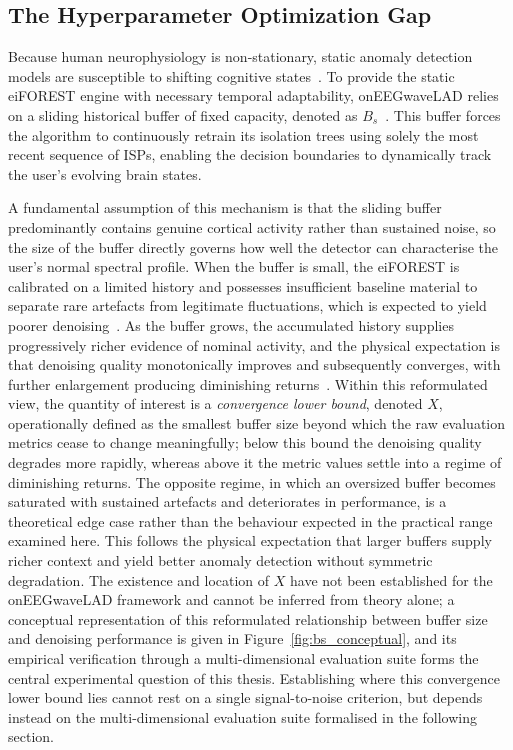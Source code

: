 \documentclass[MScCS,12pt,oneside,final]{uccthesis}
\begin{document}
        \subsection{The Hyperparameter Optimization Gap}
        \label{subsec:hyperparameter_gap}
        
        Because human neurophysiology is non-stationary, static anomaly detection models are susceptible to shifting cognitive states~\parencite{kaplan1999nonstationary}. To provide the static eiFOREST engine with necessary temporal adaptability, onEEGwaveLAD relies on a sliding historical buffer of fixed capacity, denoted as $B_s$~\parencite{longo2025oneegwavelad}. This buffer forces the algorithm to continuously retrain its isolation trees using solely the most recent sequence of ISPs, enabling the decision boundaries to dynamically track the user's evolving brain states.
        
        A fundamental assumption of this mechanism is that the sliding buffer predominantly contains genuine cortical activity rather than sustained noise, so the size of the buffer directly governs how well the detector can characterise the user's normal 
spectral profile. When the buffer is small, the eiFOREST is calibrated on a limited history and possesses insufficient baseline material to separate rare artefacts from legitimate fluctuations, which is expected to yield poorer denoising~\parencite{longo2025oneegwavelad}. As the buffer grows, the accumulated history supplies progressively richer evidence of nominal activity, and the physical expectation is that denoising quality monotonically improves and subsequently converges, with further enlargement producing diminishing returns~\parencite{gama2014survey}. Within this reformulated view, the quantity of interest is a \emph{convergence lower bound}, denoted $X$, operationally defined as the smallest buffer size beyond which the raw evaluation metrics cease to change meaningfully; below this bound the denoising quality degrades more rapidly, whereas above it the metric values settle into a regime of diminishing returns. The opposite regime, in which an oversized buffer becomes saturated with sustained artefacts and deteriorates in performance, is a theoretical edge case rather than the behaviour expected in the practical range examined here. This follows the physical expectation that larger buffers supply richer context and yield better anomaly detection without symmetric degradation. The existence and location of $X$ have not been established for the onEEGwaveLAD framework and cannot be inferred from theory alone; a conceptual representation of this reformulated relationship between buffer size and denoising performance is given in Figure~\ref{fig:bs_conceptual}, and its empirical verification through a multi-dimensional evaluation suite forms the central experimental question of this thesis. Establishing where this convergence lower bound lies cannot rest on a single signal-to-noise criterion, but depends instead on the multi-dimensional evaluation suite formalised in the following section.
        
\end{document}
